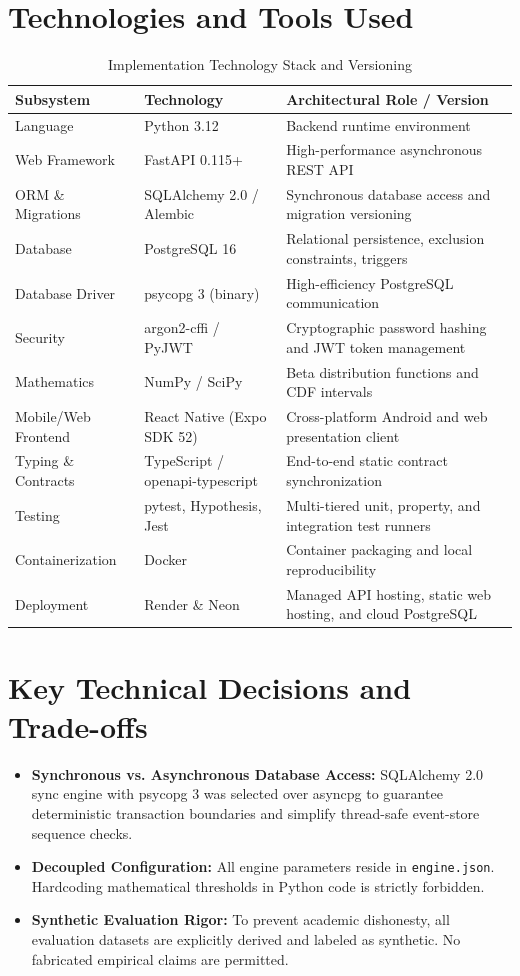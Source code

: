 \section{Technologies and Tools Used}
\begin{table}[htbp]
\centering
\caption{Implementation Technology Stack and Versioning}
\label{tab:tech_stack}
\small
\begin{tabularx}{\textwidth}{l l p{6.5cm}}
\toprule
\textbf{Subsystem} & \textbf{Technology} & \textbf{Architectural Role / Version} \\
\midrule
Language & Python 3.12 & Backend runtime environment \\
Web Framework & FastAPI 0.115+ & High-performance asynchronous REST API \\
ORM \& Migrations & SQLAlchemy 2.0 / Alembic & Synchronous database access and migration versioning \\
Database & PostgreSQL 16 & Relational persistence, exclusion constraints, triggers \\
Database Driver & psycopg 3 (binary) & High-efficiency PostgreSQL communication \\
Security & argon2-cffi / PyJWT & Cryptographic password hashing and JWT token management \\
Mathematics & NumPy / SciPy & Beta distribution functions and CDF intervals \\
Mobile/Web Frontend & React Native (Expo SDK 52) & Cross-platform Android and web presentation client \\
Typing \& Contracts & TypeScript / openapi-typescript & End-to-end static contract synchronization \\
Testing & pytest, Hypothesis, Jest & Multi-tiered unit, property, and integration test runners \\
Containerization & Docker & Container packaging and local reproducibility \\
Deployment & Render \& Neon & Managed API hosting, static web hosting, and cloud PostgreSQL \\
\bottomrule
\end{tabularx}
\end{table}

\section{Key Technical Decisions and Trade-offs}
\begin{itemize}
    \item \textbf{Synchronous vs. Asynchronous Database Access:} SQLAlchemy 2.0 sync engine with psycopg 3 was selected over asyncpg to guarantee deterministic transaction boundaries and simplify thread-safe event-store sequence checks.
    \item \textbf{Decoupled Configuration:} All engine parameters reside in \texttt{engine.json}. Hardcoding mathematical thresholds in Python code is strictly forbidden.
    \item \textbf{Synthetic Evaluation Rigor:} To prevent academic dishonesty, all evaluation datasets are explicitly derived and labeled as synthetic. No fabricated empirical claims are permitted.
\end{itemize}
